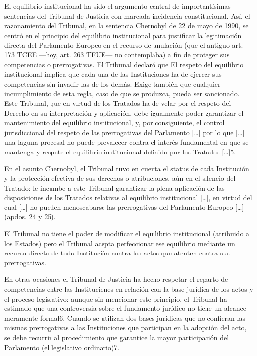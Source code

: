 \documentclass[10pt,a4paper]{article}
\begin{document}
El equilibrio institucional ha sido el argumento central de importantísimas sentencias del Tribunal de Justicia con marcada incidencia constitucional. Así, el razonamiento del Tribunal, en la sentencia Chernobyl de 22 de mayo de 1990, se centró en el principio del equilibrio institucional para justificar la legitimación directa del Parlamento Europeo en el recurso de anulación (que el antiguo art. 173 TCEE —hoy, art. 263 TFUE— no contemplaba) a fin de proteger sus competencias o prerrogativas. El Tribunal declaró que El respeto del equilibrio institucional implica que cada una de las Instituciones ha de ejercer sus competencias sin invadir las de los demás. Exige también que cualquier incumplimiento de esta regla, caso de que se produzca, pueda ser sancionado. Este Tribunal, que en virtud de los Tratados ha de velar por el respeto del Derecho en su interpretación y aplicación, debe igualmente poder garantizar el mantenimiento del equilibrio institucional, y, por consiguiente, el control jurisdiccional del respeto de las prerrogativas del Parlamento […] por lo que […] una laguna procesal no puede prevalecer contra el interés fundamental en que se mantenga y respete el equilibrio institucional definido por los Tratados […]5. 

En el asunto Chernobyl, el Tribunal tuvo en cuenta el status de cada Institución y la protección efectiva de sus derechos o atribuciones, aún en el silencio del Tratado: le incumbe a este Tribunal garantizar la plena aplicación de las disposiciones de los Tratados relativas al equilibrio institucional […], en virtud del cual […] no pueden menoscabarse las prerrogativas del Parlamento Europeo […] (apdos. 24 y 25).

El Tribunal no tiene el poder de modificar el equilibrio institucional (atribuido a los Estados) pero el Tribunal acepta perfeccionar ese equilibrio mediante un recurso directo de toda Institución contra los actos que atenten contra sus prerrogativas.

En otras ocasiones el Tribunal de Justicia ha hecho respetar el reparto de competencias entre las Instituciones en relación con la base jurídica de los actos y el proceso legislativo: aunque sin mencionar este principio, el Tribunal ha estimado que una controversia sobre el fundamento jurídico no tiene un alcance meramente formal6. Cuando se utilizan dos bases jurídicas que no confieran las mismas prerrogativas a las Instituciones que participan en la adopción del acto, se debe recurrir al procedimiento que garantice la mayor participación del Parlamento (el legislativo ordinario)7.
\end{document}
